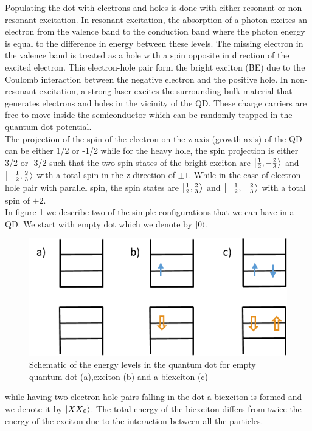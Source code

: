 	Populating the dot with electrons and holes is done with either resonant or non-resonant excitation. In resonant excitation, the absorption of a photon excites an electron from the valence band to the conduction band where the photon energy is equal to the difference in energy between these levels. The missing electron in the valence band is treated as a hole with a spin opposite in direction of the excited electron. This electron-hole pair form the bright exciton (BE) due to the Coulomb interaction between the negative electron and the positive hole. In non-resonant excitation, a strong laser excites the surrounding bulk material that generates electrons and holes in the vicinity of the QD. These charge carriers are free to move inside the semiconductor which can  be randomly trapped in the quantum dot potential. \\
	The projection of the spin of the electron on the z-axis (growth axis) of the QD can be either 1/2 or -1/2 while for the heavy hole, the spin 
 projection is either 3/2 or -3/2 such that the two spin states of the bright exciton are $\ket{\frac{1}{2},-\frac{2}{3}}$ and $\ket{-\frac{1}
 {2},\frac{2}{3}}$  with a total spin in the z direction  of $\pm1$. While in the case of electron-hole pair with parallel spin, the spin states are $\ket{\frac{1}{2},\frac{2}{3}}$ and $\ket{-\frac{1}{2},-\frac{2}{3}}$ with a total spin of $\pm2$.\\
	In figure \ref{fig:energy_levels} we describe two of the simple configurations that we can have in a QD. We start with empty dot which we denote by $\ket{0}$.
	\begin{figure}[H]
		\centering
		\includegraphics[scale=1]{figures/energy-levels.png}
		\caption{Schematic of the energy levels in the quantum dot for empty quantum dot (a),exciton (b) and a biexciton (c)}
		\label{fig:energy_levels}
	\end{figure}
	while having two electron-hole pairs falling in the dot a biexciton is formed and we denote it by $\ket{{XX}_0}$. The total energy of the biexciton differs from twice the energy of the exciton due to the interaction between all the particles.\\
	
